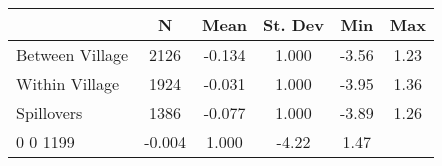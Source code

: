 \begin{tabular}{l*{5}{c}}\hline&\multicolumn{1}{c}{N}&\multicolumn{1}{c}{Mean}&\multicolumn{1}{c}{St. Dev}&\multicolumn{1}{c}{Min}&\multicolumn{1}{c}{Max}\\ \hline 
Between Village & 2126 & -0.134 & 1.000 & -3.56 & 1.23 \\
Within Village & 1924 & -0.031 & 1.000 & -3.95 & 1.36 \\
Spillovers & 1386 & -0.077 & 1.000 & -3.89 & 1.26 \\
0 0 1199 & -0.004 & 1.000 & -4.22 & 1.47 \\
\hline \end{tabular}
